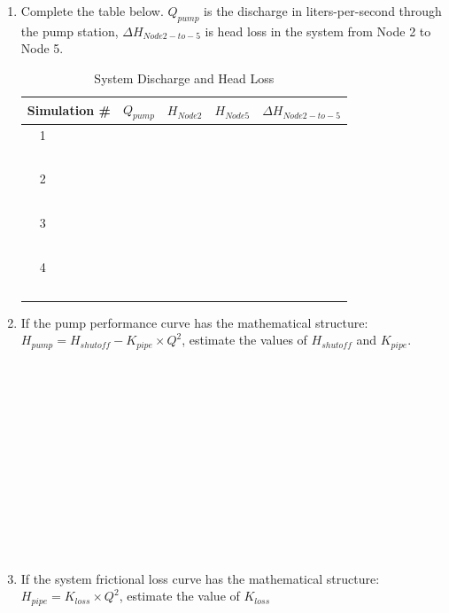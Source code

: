 \documentclass[11pt]{article}
\begin{document}
\begin{enumerate}
\begin{enumerate}
\item Complete the table below.  $Q_{pump}$ is the discharge in liters-per-second through the pump station, $\Delta H_{Node 2 -to- 5}$ is head loss in the system from Node 2 to Node 5.
\begin{table}[htbp]
   \centering
      \caption{System Discharge and Head Loss}
   \begin{tabular}{p{1in} p{1in} p{1in} p{1in} p{1in} } %
Simulation \# & $Q_{pump}$ & $H_{Node2}$ & $H_{Node5}$ & $\Delta H_{Node 2 -to- 5}$ \\
\hline
\hline
~~1 & ~ &~ & ~ & ~ \\
~ & ~ &~ & ~ & ~ \\
\hline
~~2 & ~ &~ & ~ & ~ \\
~ & ~ &~ & ~ & ~ \\
\hline
~~3 & ~ &~ & ~ & ~\\
~ & ~ &~ & ~ & ~ \\
\hline
~~4 & ~ &~ & ~ & ~ \\
~ & ~ &~ & ~ & ~ \\
\hline
   \end{tabular}
   \label{tab:system-curve}
\end{table}



\item If the pump performance curve has the mathematical structure: ~\\
$H_{pump} = H_{shutoff} - K_{pipe} \times Q^2$, estimate the values of $H_{shutoff}$  and $K_{pipe}$.
\\
\\
\\
\\
\\
\\
\\
\\
\\
\\
\\
\\
\\
\item If the system frictional loss curve has the mathematical structure:
 $H_{pipe}= K_{loss} \times Q^2$, estimate the value of $K_{loss}$


\end{enumerate}
\end{enumerate}
\end{document}
